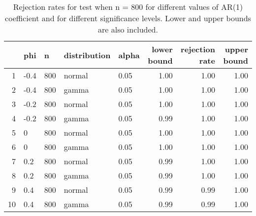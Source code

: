 \begin{table}[ht]
\centering
\caption{Rejection rates for test when n = 800 for 
                   different values of AR(1) coefficient and for different 
                   significance levels. Lower and upper bounds are also 
                   included.} 
\label{table:rr_800}
\begin{tabular}{rllllrrr}
  \hline
 & phi & n & distribution & alpha & lower bound & rejection rate & upper bound \\ 
  \hline
1 & -0.4 & 800 & normal & 0.05 & 1.00 & 1.00 & 1.00 \\ 
  2 & -0.4 & 800 & gamma & 0.05 & 1.00 & 1.00 & 1.00 \\ 
  3 & -0.2 & 800 & normal & 0.05 & 1.00 & 1.00 & 1.00 \\ 
  4 & -0.2 & 800 & gamma & 0.05 & 0.99 & 1.00 & 1.00 \\ 
  5 & 0 & 800 & normal & 0.05 & 1.00 & 1.00 & 1.00 \\ 
  6 & 0 & 800 & gamma & 0.05 & 1.00 & 1.00 & 1.00 \\ 
  7 & 0.2 & 800 & normal & 0.05 & 0.99 & 1.00 & 1.00 \\ 
  8 & 0.2 & 800 & gamma & 0.05 & 0.99 & 1.00 & 1.00 \\ 
  9 & 0.4 & 800 & normal & 0.05 & 0.99 & 0.99 & 1.00 \\ 
  10 & 0.4 & 800 & gamma & 0.05 & 0.99 & 0.99 & 1.00 \\ 
   \hline
\end{tabular}
\end{table}

